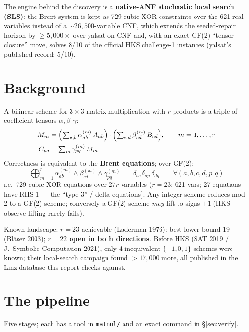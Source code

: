 \documentclass[10pt]{article}
\begin{document}
The engine behind the discovery is a \textbf{native-ANF stochastic
local search (SLS)}: the Brent system is kept as 729 cubic-XOR
constraints over the 621 real variables instead of a
${\sim}26{,}500$-variable CNF, which extends the seeded-repair horizon
by $\ge 5{,}000\times$ over yalsat-on-CNF and, with an exact GF(2)
``tensor closure'' move, solves 8/10 of the official HKS challenge-1
instances (yalsat's published record: 5/10).

\section{Background}\label{sec:background}

A bilinear scheme for $3\times 3$ matrix multiplication with $r$
products is a triple of coefficient tensors $\alpha, \beta, \gamma$:
\begin{align*}
M_m &= \Bigl(\textstyle\sum_{a,b} \alpha^{(m)}_{ab}\,A_{ab}\Bigr)\cdot
       \Bigl(\textstyle\sum_{c,d} \beta^{(m)}_{cd}\,B_{cd}\Bigr),
       \qquad m = 1,\dots,r\\
C_{pq} &= \textstyle\sum_{m} \gamma^{(m)}_{pq}\,M_m
\end{align*}
Correctness is equivalent to the \textbf{Brent equations}; over GF(2):
\begin{equation*}
\bigoplus_{m=1}^{r} \alpha^{(m)}_{ab} \wedge \beta^{(m)}_{cd} \wedge
\gamma^{(m)}_{pq} \;=\; \delta_{bc}\,\delta_{ap}\,\delta_{dq}
\qquad \forall (a,b,c,d,p,q)
\end{equation*}
i.e.\ 729 cubic XOR equations over $27r$ variables ($r{=}23$: 621
vars; 27 equations have RHS 1 --- the ``type-3'' / delta equations).
Any integer scheme reduces mod 2 to a GF(2) scheme; conversely a GF(2)
scheme \emph{may} lift to signs $\pm 1$ (HKS observe lifting rarely
fails).

Known landscape: $r{=}23$ achievable (Laderman 1976); best lower bound
19 (Bl\"aser 2003); \textbf{$r{=}22$ open in both directions}. Before
HKS (SAT 2019 / J.~Symbolic Computation 2021), only 4 inequivalent
$\{-1,0,1\}$ schemes were known; their local-search campaign found
${>}17{,}000$ more, all published in the Linz database this report
checks against.

\section{The pipeline}\label{sec:pipeline}

Five stages; each has a tool in \texttt{matmul/} and an exact command
in \S\ref{sec:verify}.
\end{document}
